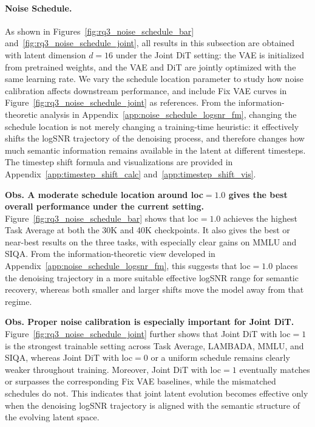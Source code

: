 \paragraph{Noise Schedule. }
As shown in Figures~\ref{fig:rq3_noise_schedule_bar} and~\ref{fig:rq3_noise_schedule_joint}, all results in this subsection are obtained with latent dimension $d=16$ under the Joint DiT setting: the VAE is initialized from pretrained weights, and the VAE and DiT are jointly optimized with the same learning rate. We vary the schedule location parameter to study how noise calibration affects downstream performance, and include Fix VAE curves in Figure~\ref{fig:rq3_noise_schedule_joint} as references. From the information-theoretic analysis in Appendix~\ref{app:noise_schedule_logsnr_fm}, changing the schedule location is not merely changing a training-time heuristic: it effectively shifts the logSNR trajectory of the denoising process, and therefore changes how much semantic information remains available in the latent at different timesteps. The timestep shift formula and visualizations are provided in Appendix~\ref{app:timestep_shift_calc} and~\ref{app:timestep_shift_vis}.


\textbf{Obs.  A moderate schedule location around loc$=1.0$ gives the best overall performance under the current setting.}
Figure~\ref{fig:rq3_noise_schedule_bar} shows that loc$=1.0$ achieves the highest Task Average at both the 30K and 40K checkpoints. It also gives the best or near-best results on the three tasks, with especially clear gains on MMLU and SIQA. From the information-theoretic view developed in Appendix~\ref{app:noise_schedule_logsnr_fm}, this suggests that loc$=1.0$ places the denoising trajectory in a more suitable effective logSNR range for semantic recovery, whereas both smaller and larger shifts move the model away from that regime.

\textbf{Obs.  Proper noise calibration is especially important for Joint DiT.}
Figure~\ref{fig:rq3_noise_schedule_joint} further shows that Joint DiT with loc$=1$ is the strongest trainable setting across Task Average, LAMBADA, MMLU, and SIQA, whereas Joint DiT with loc$=0$ or a uniform schedule remains clearly weaker throughout training. Moreover, Joint DiT with loc$=1$ eventually matches or surpasses the corresponding Fix VAE baselines, while the mismatched schedules do not. This indicates that joint latent evolution becomes effective only when the denoising logSNR trajectory is aligned with the semantic structure of the evolving latent space.

